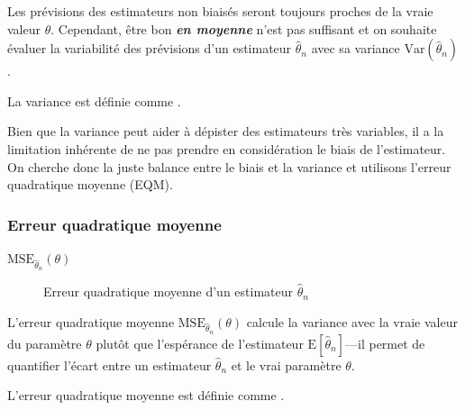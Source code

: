 \documentclass[10pt, french]{article}
\begin{document}
\begin{multicols*}{2}
\begin{rappel_enhanced}[Motivation]
Les prévisions des estimateurs non biaisés seront toujours proches de la vraie valeur $\theta$. Cependant, être bon \textit{\textbf{en moyenne}} n'est pas suffisant et on souhaite évaluer la variabilité des prévisions d'un estimateur $\hat{\theta}_{n}$ avec sa variance $\text{Var}(\hat{\theta}_{n})$. 
\end{rappel_enhanced}

\begin{definitionNOHFILL}
La variance est définie comme .
\end{definitionNOHFILL}

\begin{rappel_enhanced}[Limitations]
Bien que la variance peut aider à dépister des estimateurs très variables, il a la limitation inhérente de ne pas prendre en considération le biais de l'estimateur. On cherche donc la juste balance entre le biais et la variance et utilisons l'erreur quadratique moyenne (EQM). 
\end{rappel_enhanced}



\columnbreak
\subsubsection{Erreur quadratique moyenne}
\begin{distributions}[Notation]
\begin{description}
	\item[$\text{MSE}_{\hat{\theta}_{n}}(\theta)$]	Erreur quadratique moyenne d'un estimateur $\hat{\theta}_{n}$
\end{description}
\end{distributions}

\begin{rappel_enhanced}[Motivation]
L'erreur quadratique moyenne $\text{MSE}_{\hat{\theta}_{n}}(\theta)$ calcule la variance avec la vraie valeur du paramètre $\theta$ plutôt que l'espérance de l'estimateur $\text{E}[\hat{\theta}_{n}]$---il permet de quantifier l'écart entre un estimateur $\hat{\theta}_{n}$ et le vrai paramètre $\theta$.
\end{rappel_enhanced}

\begin{definitionNOHFILL}
L'erreur quadratique moyenne est définie comme . \\


\end{definitionNOHFILL}
\end{multicols*}
\end{document}
